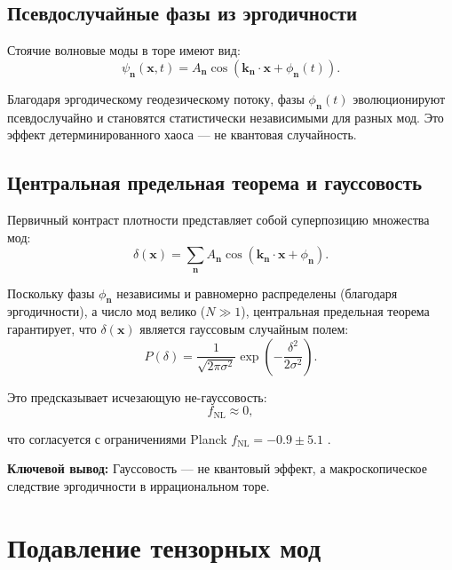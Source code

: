 \documentclass[12pt,a4paper]{article}
\begin{document}
\subsection{Псевдослучайные фазы из эргодичности}

Стоячие волновые моды в торе имеют вид:
\begin{equation}
\psi_{\mathbf{n}}(\mathbf{x}, t) = A_{\mathbf{n}} \cos(\mathbf{k}_{\mathbf{n}} \cdot \mathbf{x} + \phi_{\mathbf{n}}(t)).
\end{equation}

Благодаря эргодическому геодезическому потоку, фазы $\phi_{\mathbf{n}}(t)$ эволюционируют псевдослучайно и становятся статистически независимыми для разных мод. Это эффект детерминированного хаоса — не квантовая случайность.

\subsection{Центральная предельная теорема и гауссовость}

Первичный контраст плотности представляет собой суперпозицию множества мод:
\begin{equation}
\delta(\mathbf{x}) = \sum_{\mathbf{n}} A_{\mathbf{n}} \cos(\mathbf{k}_{\mathbf{n}} \cdot \mathbf{x} + \phi_{\mathbf{n}}).
\end{equation}

Поскольку фазы $\phi_{\mathbf{n}}$ независимы и равномерно распределены (благодаря эргодичности), а число мод велико ($N \gg 1$), центральная предельная теорема гарантирует, что $\delta(\mathbf{x})$ является гауссовым случайным полем:
\begin{equation}
P(\delta) = \frac{1}{\sqrt{2\pi \sigma^2}} \exp\left(-\frac{\delta^2}{2\sigma^2}\right).
\end{equation}

Это предсказывает исчезающую не-гауссовость:
\begin{equation}
f_{\mathrm{NL}} \approx 0,
\end{equation}

что согласуется с ограничениями Planck $f_{\mathrm{NL}} = -0.9 \pm 5.1$ \citep{Planck2020}.

\textbf{Ключевой вывод:} Гауссовость — не квантовый эффект, а макроскопическое следствие эргодичности в иррациональном торе.

\section{Подавление тензорных мод}
\end{document}
